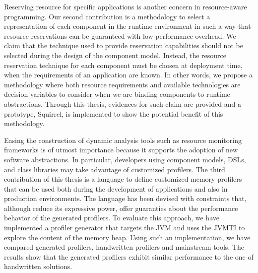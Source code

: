 Reserving resource for specific applications is another concern in resource-aware programming.
Our second contribution is a methodology to select a representation of each component in the runtime environment in such a way that resource reservations can be guaranteed with low performance overhead.
We claim that the technique used to provide reservation capabilities should not be selected during the design of the component model.
Instead, the resource reservation technique for each component must be chosen at deployment time, when the requirements of an application are known.
In other words, we propose a methodology where both resource requirements and available technologies are decision variables to consider when we are binding components to runtime abstractions.
Through this thesis, evidences for such claim are provided and a prototype, Squirrel, is implemented to show the potential benefit of this methodology.


Easing the construction of dynamic analysis tools such as resource monitoring frameworks is of utmost importance because it supports the adoption of new software abstractions.
In particular, developers using component models, DSLs, and class libraries may take advantage of customized profilers.
The third contribution of this thesis is a language to define customized memory profilers that can be used both during the development of applications and also in production environments.
The language has been devised with constraints that, although reduce its expressive power, offer guaranties about the performance behavior of the generated profilers.
To evaluate this approach, we have implemented a profiler generator that targets the JVM and uses the JVMTI to explore the content of the memory heap.
Using such an implementation, we have compared generated profilers, handwritten profilers and mainstream tools.
The results show that the generated profilers exhibit similar performance to the one of handwritten solutions.

